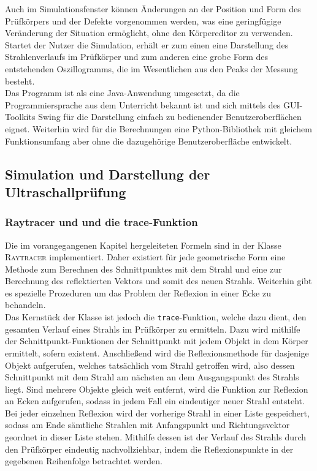 \documentclass[reducespace,stylepage,semiarbeit]{spezidoc}
\begin{document}
Auch im Simulationsfenster können Änderungen an der Position und Form des Prüfkörpers und der Defekte vorgenommen werden, was eine geringfügige Veränderung der Situation ermöglicht, ohne den Körpereditor zu verwenden.
Startet der Nutzer die Simulation, erhält er zum einen eine Darstellung des Strahlenverlaufs im Prüfkörper und zum anderen eine grobe Form des entstehenden Oszillogramms, die im Wesentlichen aus den Peaks der Messung besteht. \\
Das Programm ist als eine Java-Anwendung umgesetzt, da die Programmiersprache aus dem Unterricht bekannt ist und sich mittels des GUI-Toolkits Swing für die Darstellung einfach zu bedienender Benutzeroberflächen eignet.
Weiterhin wird für die Berechnungen eine Python-Bibliothek mit gleichem Funktionsumfang aber ohne die dazugehörige Benutzeroberfläche entwickelt.

\subsection{Simulation und Darstellung der Ultraschallprüfung}

\subsubsection{Raytracer und und die trace-Funktion}
Die im vorangegangenen Kapitel hergeleiteten Formeln sind in der Klasse \textsc{Raytracer} implementiert. 
Daher existiert für jede geometrische Form eine Methode zum Berechnen des Schnittpunktes mit dem Strahl und eine zur Berechnung des reflektierten Vektors und somit des neuen Strahls. 
Weiterhin gibt es spezielle Prozeduren um das Problem der Reflexion in einer Ecke zu behandeln.\\
Das Kernstück der Klasse ist jedoch die \texttt{trace}-Funktion, welche dazu dient, den gesamten Verlauf eines Strahls im Prüfkörper zu ermitteln. 
Dazu wird mithilfe der Schnittpunkt-Funktionen der Schnittpunkt mit jedem Objekt in dem Körper ermittelt, sofern existent. 
Anschließend wird die Reflexionsmethode für dasjenige Objekt aufgerufen, welches tatsächlich vom Strahl getroffen wird, also dessen Schnittpunkt mit dem Strahl am nächsten an dem Ausgangspunkt des Strahls liegt. 
Sind mehrere Objekte gleich weit entfernt, wird die Funktion zur Reflexion an Ecken aufgerufen, sodass in jedem Fall ein eindeutiger neuer Strahl entsteht.\\
Bei jeder einzelnen Reflexion wird der vorherige Strahl in einer Liste gespeichert, sodass am Ende sämtliche Strahlen mit Anfangspunkt und Richtungsvektor geordnet in dieser Liste stehen. 
Mithilfe dessen ist der Verlauf des Strahls durch den Prüfkörper eindeutig nachvollziehbar, indem die Reflexionspunkte in der gegebenen Reihenfolge betrachtet werden.
\end{document}

